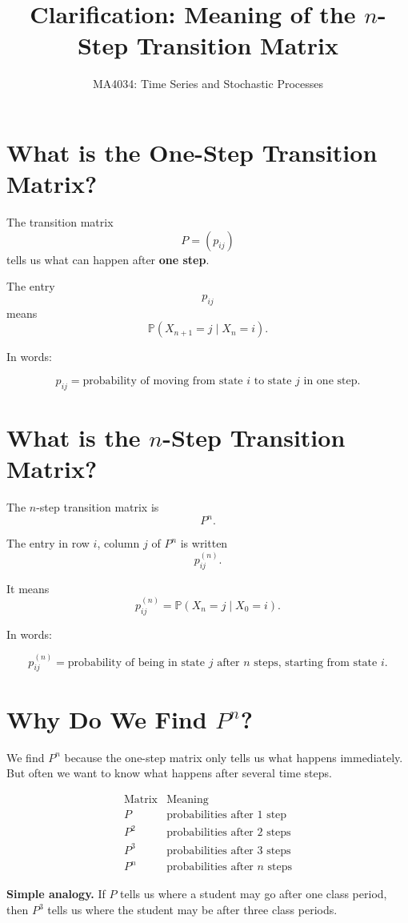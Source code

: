 \documentclass[12pt,a4paper]{article}
\title{\textbf{Clarification: Meaning of the $n$-Step Transition Matrix}}
\author{MA4034: Time Series and Stochastic Processes}
\date{}
\theoremstyle{notestyle}
\newcommand{\Prob}{\mathbb{P}}
\begin{document}
\maketitle

\section{What is the One-Step Transition Matrix?}

The transition matrix
\[
P=(p_{ij})
\]
tells us what can happen after \textbf{one step}.

The entry
\[
p_{ij}
\]
means
\[
\Prob(X_{n+1}=j\mid X_n=i).
\]

In words:

\[
p_{ij}=\text{probability of moving from state }i\text{ to state }j\text{ in one step}.
\]

\section{What is the $n$-Step Transition Matrix?}

The $n$-step transition matrix is
\[
P^n.
\]

The entry in row $i$, column $j$ of $P^n$ is written
\[
p_{ij}^{(n)}.
\]

It means
\[
p_{ij}^{(n)}
=
\Prob(X_n=j\mid X_0=i).
\]

In words:

\[
p_{ij}^{(n)}
=
\text{probability of being in state }j\text{ after }n\text{ steps, starting from state }i.
\]

\section{Why Do We Find $P^n$?}

We find $P^n$ because the one-step matrix only tells us what happens immediately. But often we want to know what happens after several time steps.

\[
\begin{array}{c|c}
\text{Matrix} & \text{Meaning}\\
\hline
P & \text{probabilities after 1 step}\\
P^2 & \text{probabilities after 2 steps}\\
P^3 & \text{probabilities after 3 steps}\\
P^n & \text{probabilities after }n\text{ steps}
\end{array}
\]

\textbf{Simple analogy.} If $P$ tells us where a student may go after one class period, then $P^3$ tells us where the student may be after three class periods.
\end{document}
